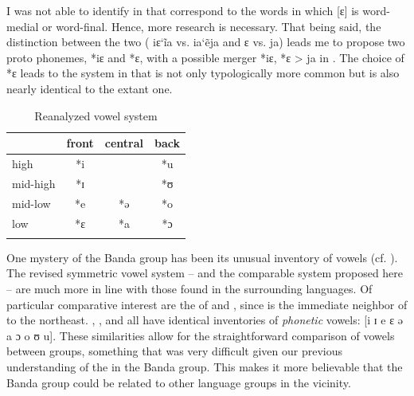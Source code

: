 \documentclass[output=paper,colorlinks,citecolor=brown]{langscibook}
\begin{document}
I was not able to identify  in  that correspond to the  words in which [ɛ] is word-medial or word-final. Hence, more research is necessary. That being said, the distinction between the two  ( iɛ\char`\~ia vs.  ia\char`\~eja and  ɛ vs.  ja) leads me to propose two proto phonemes, *iɛ and *ɛ, with a possible merger *iɛ, *ɛ > ja in . The choice of *ɛ leads to the  system in  that is not only typologically  more common but is also nearly identical to the extant  one.

\begin{table}
\caption{Reanalyzed  vowel system}
\label{tab:olson:14}
 \begin{tabular}{lccc}
    \lsptoprule
                    & front & central   & back\\
    \midrule
        high        & *i    &           & *u\\
        mid-high    & *ɪ    &           & *ʊ\\
        mid-low     & *e    & *ə        & *o\\
        low         & *ɛ    & *a        & *ɔ\\
    \lspbottomrule
    \end{tabular}
\end{table}

One mystery of the Banda  group has been its unusual inventory of vowels (cf. ). The revised symmetric  vowel system  -- and the comparable  system proposed here -- are much more in line with those found in the surrounding languages. Of particular comparative interest are the  of  and , since  is the immediate neighbor of  to the northeast. , , and  all have identical inventories of \textit{phonetic} vowels: [i ɪ e ɛ ə a ɔ o ʊ u]. These similarities allow for the straightforward comparison of vowels between groups, something that was very difficult given our previous understanding of the  in the Banda  group. This makes it more believable that the Banda  group could be related to other language groups in the vicinity.

\subsection{}
\end{document}
